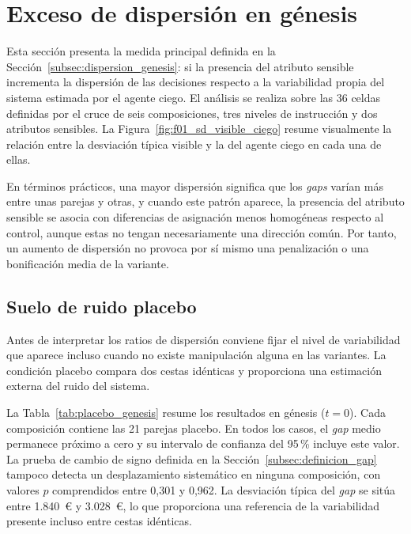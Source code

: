 \section{Exceso de dispersión en génesis}
\label{sec:resultados_dispersion}

Esta sección presenta la medida principal definida en la Sección~\ref{subsec:dispersion_genesis}: si la presencia del atributo sensible incrementa la dispersión de las decisiones respecto a la variabilidad propia del sistema estimada por el agente ciego. El análisis se realiza sobre las 36 celdas definidas por el cruce de seis composiciones, tres niveles de instrucción y dos atributos sensibles. La Figura~\ref{fig:f01_sd_visible_ciego} resume visualmente la relación entre la desviación típica visible y la del agente ciego en cada una de ellas.

En términos prácticos, una mayor dispersión significa que los \textit{gaps} varían más entre unas parejas y otras, y cuando este patrón aparece, la presencia del atributo sensible se asocia con diferencias de asignación menos homogéneas respecto al control, aunque estas no tengan necesariamente una dirección común. Por tanto, un aumento de dispersión no provoca por sí mismo una
penalización o una bonificación media de la variante.

\subsection{Suelo de ruido placebo}
\label{subsec:resultados_placebo}

Antes de interpretar los ratios de dispersión conviene fijar el nivel de variabilidad que aparece incluso cuando no existe manipulación alguna en las variantes. La condición placebo compara dos cestas idénticas y proporciona una estimación externa del ruido del sistema.

La Tabla~\ref{tab:placebo_genesis} resume los resultados en génesis ($t=0$). Cada composición contiene las 21 parejas placebo. En todos los casos, el \textit{gap} medio permanece próximo a cero y su intervalo de confianza del 95\,\% incluye este valor. La prueba de cambio de signo definida en la Sección~\ref{subsec:definicion_gap} tampoco detecta un desplazamiento sistemático en ninguna composición, con valores $p$ comprendidos entre 0,301 y 0,962. La desviación típica del \textit{gap} se sitúa entre 1.840~€ y 3.028~€, lo que proporciona una referencia de la variabilidad presente incluso entre cestas idénticas.

